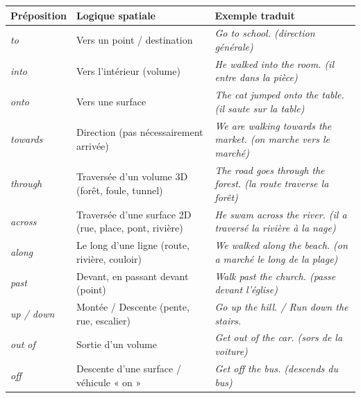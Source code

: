 \documentclass[11pt]{article}
\newcommand{\eng}[1]{\ifmmode\text{\textit{#1}}\else\begingroup\selectlanguage{english}\itshape #1\endgroup\fi}
\begin{document}
\begin{center}
\begin{tabularx}{\linewidth}{|X|X|X|}
\hline
\rowcolor{popblueL} Préposition & Logique spatiale & Exemple traduit \\
\hline
\eng{to} & Vers un point / destination & \eng{Go to school.} (direction générale) \\
\hline
\eng{into} & Vers l'intérieur (volume) & \eng{He walked into the room.} (il entre \emph{dans} la pièce) \\
\hline
\eng{onto} & Vers une surface & \eng{The cat jumped onto the table.} (il saute \emph{sur} la table) \\
\hline
\eng{towards} & Direction (pas nécessairement arrivée) & \eng{We are walking towards the market.} (on marche \emph{vers} le marché) \\
\hline
\eng{through} & Traversée d'un volume 3D (forêt, foule, tunnel) & \eng{The road goes through the forest.} (la route traverse la forêt) \\
\hline
\eng{across} & Traversée d'une surface 2D (rue, place, pont, rivière) & \eng{He swam across the river.} (il a traversé la rivière à la nage) \\
\hline
\eng{along} & Le long d'une ligne (route, rivière, couloir) & \eng{We walked along the beach.} (on a marché le long de la plage) \\
\hline
\eng{past} & Devant, en passant devant (point) & \eng{Walk past the church.} (passe devant l'église) \\
\hline
\eng{up / down} & Montée / Descente (pente, rue, escalier) & \eng{Go up the hill.} / \eng{Run down the stairs.} \\
\hline
\eng{out of} & Sortie d'un volume & \eng{Get out of the car.} (sors de la voiture) \\
\hline
\eng{off} & Descente d'une surface / véhicule « on » & \eng{Get off the bus.} (descends du bus) \\
\hline
\end{tabularx}
\end{center}
\end{document}
